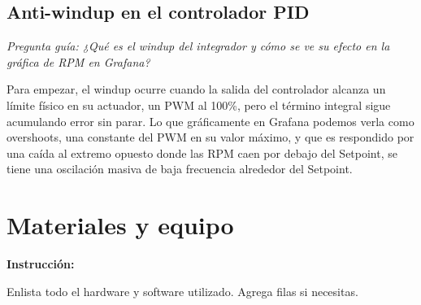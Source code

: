 \documentclass[11pt, letterpaper]{article}
\newenvironment{instruccion}{%
  \begin{mdframed}[backgroundcolor=tealLight,linecolor=tealMain,linewidth=1pt,
    innerleftmargin=10pt,innerrightmargin=10pt,
    innertopmargin=6pt,innerbottommargin=6pt]
  \small\textbf{\color{tealMain}Instrucci\'on:}\hspace{4pt}
}{\end{mdframed}}
\begin{document}
\vspace{0.4cm}

\subsection{Anti-windup en el controlador PID}

\textit{Pregunta gu\'ia: ¿Qu\'e es el windup del integrador y
c\'omo se ve su efecto en la gr\'afica de RPM en Grafana?}

Para empezar, el windup ocurre cuando la salida del controlador alcanza un l\'imite f\'isico en su actuador, un PWM al 100\%, pero el t\'ermino integral sigue acumulando error sin parar. Lo que gr\'aficamente en Grafana podemos verla como overshoots, una constante del PWM en su valor m\'aximo,  y que es respondido por una ca\'ida al extremo opuesto donde las RPM caen por debajo del Setpoint, se tiene una oscilaci\'on masiva de baja frecuencia alrededor del Setpoint.

\newpage

\section{Materiales y equipo}

\begin{instruccion}
  Enlista todo el hardware y software utilizado.
  Agrega filas si necesitas.
\end{instruccion}
\end{document}
